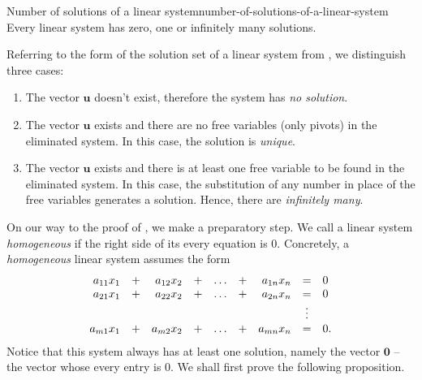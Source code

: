 \begin{corollary}{Number of solutions of a linear system}{number-of-solutions-of-a-linear-system}
 Every linear system has zero, one or infinitely many solutions.
\end{corollary}
\begin{corproof}
 Referring to the form of the solution set of a linear system from
 , we distinguish three
 cases:
 \begin{enumerate}
  \item The vector $\mathbf{u}$ doesn't exist, therefore the system has \emph{no
   solution}.
  \item The vector $\mathbf{u}$ exists and there are no free variables (only
   pivots) in the eliminated system. In this case, the solution is
   \emph{unique}.
  \item The vector $\mathbf{u}$ exists and there is at least one free variable
   to be found in the eliminated system. In this case, the substitution of any
   number in place of the free variables generates a solution. Hence, there are
   \emph{infinitely many}.
 \end{enumerate}
\end{corproof}

On our way to the proof of ,
we make a preparatory step. We call a linear system \emph{homogeneous} if the
right side of its every equation is $0$. Concretely, a \emph{homogeneous} linear
system assumes the form
\[
 \begin{array}{r c r c c c r c l}
  a_{11}x_1 & + & a_{12}x_2 & + & \ldots & + & a_{1n}x_n & = & 0\\
  a_{21}x_1 & + & a_{22}x_2 & + & \ldots & + & a_{2n}x_n & = & 0\\
            &   &           &   &        &   &           & \vdots & \\
  a_{m1}x_1 & + & a_{m2}x_2 & + & \ldots & + & a_{mn}x_n & = & 0.
 \end{array}
\]
Notice that this system always has at least one solution, namely the vector
$\mathbf{0}$ -- the vector whose every entry is $0$. We shall first prove the
following proposition.


